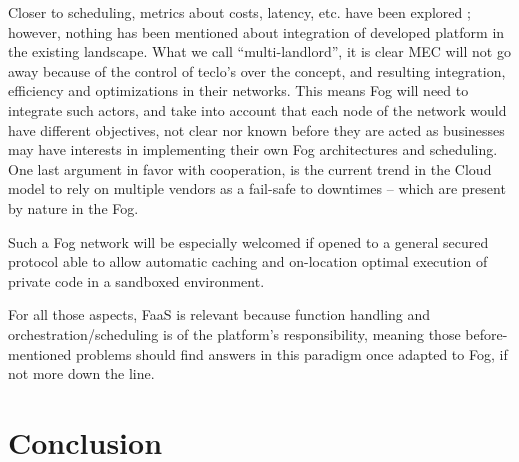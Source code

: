 \documentclass[11pt]{sdm}
\begin{document}
Closer to scheduling, metrics about costs, latency, etc. have been explored ; however, nothing has been mentioned about integration of developed platform in the existing landscape. What we call ``multi-landlord'', it is clear \gls{MEC} will not go away because of the control of teclo's over the concept, and resulting integration, efficiency and optimizations in their networks. This means Fog will need to integrate such actors, and take into account that each node of the network would have different objectives, not clear nor known before they are acted as businesses may have interests in implementing their own Fog architectures and scheduling. One last argument in favor with cooperation, is the current trend in the Cloud model to rely on multiple vendors as a fail-safe to downtimes -- which are present by nature in the Fog.

Such a Fog network will be especially welcomed if opened to a general secured protocol able to allow automatic caching and on-location optimal execution of private code in a sandboxed environment.

For all those aspects, \gls{FaaS} is relevant because function handling and orchestration/scheduling is of the platform's responsibility, meaning those before-mentioned problems should find answers in this paradigm once adapted to Fog, if not more down the line.



\section{Conclusion}

\printbibliography
\end{document}
